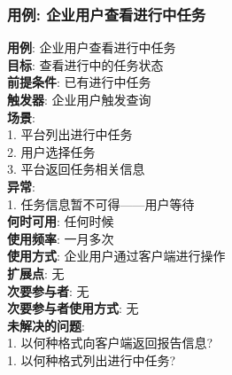 \documentclass[UTF8]{article}
\begin{document}
\subsubsection{用例: 企业用户查看进行中任务}
\noindent
\textbf{用例}: 企业用户查看进行中任务
\\
\textbf{目标}: 查看进行中的任务状态
\\
\textbf{前提条件}: 已有进行中任务
\\
\textbf{触发器}: 企业用户触发查询
\\
\textbf{场景}: \\
	\hspace*{2em} 1. 平台列出进行中任务 \\
	\hspace*{2em} 2. 用户选择任务 \\
	\hspace*{2em} 3. 平台返回任务相关信息 \\
\textbf{异常}: \\
	\hspace*{2em} 1. 任务信息暂不可得——用户等待 \\
\textbf{何时可用}: 任何时候
\\
\textbf{使用频率}: 一月多次
\\
\textbf{使用方式}: 企业用户通过客户端进行操作 \\
\textbf{扩展点}: 无
\\
\textbf{次要参与者}: 无
\\
\textbf{次要参与者使用方式}: 无
\\
\textbf{未解决的问题}: \\
	\hspace*{2em} 1. 以何种格式向客户端返回报告信息? \\
	\hspace*{2em} 1. 以何种格式列出进行中任务? \\
		
\end{document}
